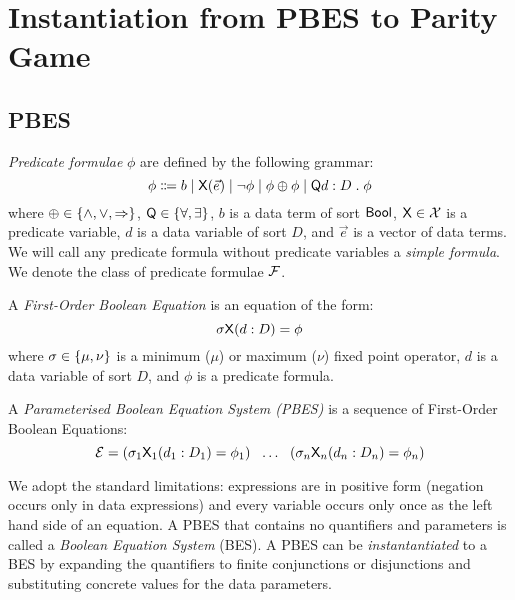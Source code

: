 \documentclass{article}
\title{\Title}
\author{\Author}
\begin{document}
\maketitle


\section{Instantiation from PBES to Parity Game}

\subsection{PBES}

\begin{definition}
\emph{Predicate formulae} $\phi$ are defined by the following grammar:
\[ \phi \Coloneqq b \mid \mathsf{X}(\vec{e}) \mid \neg \phi \mid \phi \oplus \phi \mid \mathsf{Q} d : D \mathrel{.} \phi \]
where $\oplus \in \left\lbrace \land, \lor, \mathbin{\Rightarrow} \right\rbrace$, $\mathsf{Q} \in \left\lbrace \forall, \exists \right\rbrace$, 
$b$ is a data term of sort $\mathsf{Bool}$, 
$\mathsf{X} \in \mathcal{X}$ is a predicate variable, 
$d$ is a data variable of sort $D$, and 
$\vec{e}$ is a vector of data terms.
We will call any predicate formula without predicate variables a \emph{simple formula}.
We denote the class of predicate formulae $\mathcal{F}$.
\end{definition}

\begin{definition}
A \emph{First-Order Boolean Equation} is an equation of the form:
\[ \sigma \mathsf{X}(d : D) = \phi \]
where $\sigma \in \left\lbrace \mu, \nu \right\rbrace$ is a minimum ($\mu$) or maximum ($\nu$) fixed point operator,
$d$ is a data variable of sort $D$, and
$\phi$ is a predicate formula.
\end{definition}

\begin{definition}
A \emph{Parameterised Boolean Equation System (PBES)} is a sequence of First-Order Boolean Equations:
\[ \mathcal{E} = (\sigma_1 \mathsf{X}_1(d_1 : D_1) = \phi_1) 
   \ \  \dotsc 
   \ \  (\sigma_n \mathsf{X}_n(d_n : D_n) = \phi_n) \]
\end{definition}

We adopt the standard limitations: expressions are in positive form (negation occurs only in data expressions) and every variable occurs only once as the left hand side of an equation.
A PBES that contains no quantifiers and parameters is called a \emph{Boolean Equation System} (BES).
A PBES can be \emph{instantantiated} to a BES by expanding the quantifiers to finite conjunctions
or disjunctions and substituting concrete values for the data parameters.
\end{document}
